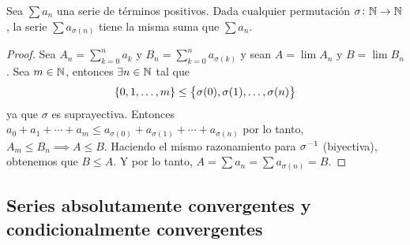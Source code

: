 \begin{prop}
	Sea $\sum a_n$ una serie de términos positivos. Dada cualquier permutación $\sigma
	\colon \mathbb{N} \to \mathbb{N}$, la serie $\sum a_{\sigma(n)}$ tiene la misma suma que $\sum a_n$.
\end{prop}

\begin{proof}
	Sea $A_n = \sum\limits_{k=0}^n a_k$ y $B_n = \sum\limits_{k=0}^n a_{\sigma(k)}$ y sean
	$A = \lim A_n$ y $B = \lim B_n$. Sea
	$m \in \mathbb{N}$, entonces $\exists n \in \mathbb{N}$ tal que
	\[
		\left\{0,1, \dots, m\right\} \leq \left\{\sigma(0), \sigma(1), \dots, \sigma(n)\right\}
	\]
	ya que $\sigma$ es suprayectiva. Entonces $a_0 + a_1 + \cdots + a_m \leq a_{\sigma(0)} + 
	a_{\sigma(1)} + \cdots + a_{\sigma(n)}$ por lo tanto, $A_m \leq B_n \implies A \leq B$.
	Haciendo el mismo razonamiento para $\sigma^{-1}$ (biyectiva), obtenemos que $B \leq A$.
	Y por lo tanto, $A = \sum a_n = \sum a_{\sigma(n)} = B$.
\end{proof}

\subsection{Series absolutamente convergentes y condicionalmente convergentes}
